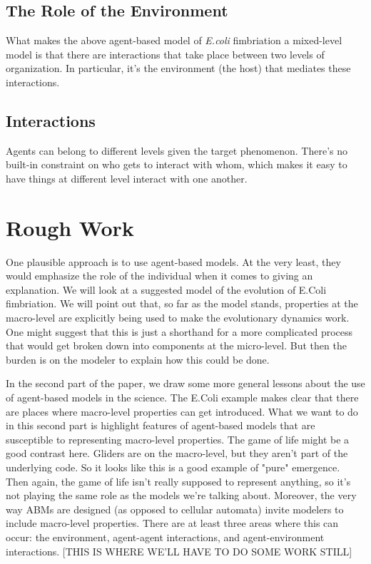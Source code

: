 \documentclass[11pt]{article}
\begin{document}
\subsection{The Role of the Environment}

What makes the above agent-based model of \emph{E.coli} fimbriation a mixed-level model is that there are interactions that take place between two levels of organization. In particular, it's the environment (the host) that mediates these interactions.

\subsection{Interactions}

Agents can belong to different levels given the target phenomenon.  There's no built-in constraint on who gets to interact with whom, which makes it easy to have things at different level interact with one another.





\section{Rough Work}

One plausible approach is to use agent-based models. At the very least, they would emphasize the role of the individual when it comes to giving an explanation. We will look at a suggested model of the evolution of E.Coli fimbriation. We will point out that, so far as the model stands, properties at the macro-level are explicitly being used to make the evolutionary dynamics work. One might suggest that this is just a shorthand for a more complicated process that would get broken down into components at the micro-level. But then the burden is on the modeler to explain how this could be done.

In the second part of the paper, we draw some more general lessons about the use of agent-based models in the science. The E.Coli example makes clear that there are places where macro-level properties can get introduced. What we want to do in this second part is highlight features of agent-based models that are susceptible to representing macro-level properties.  The game of life might be a good contrast here. Gliders are on the macro-level, but they aren't part of the underlying code. So it looks like this is a good example of "pure" emergence. Then again, the game of life isn't really supposed to represent anything, so it's not playing the same role as the models we're talking about. Moreover, the very way ABMs are designed (as opposed to cellular automata) invite modelers to include macro-level properties. There are at least three areas where this can occur: the environment, agent-agent interactions, and agent-environment interactions. [THIS IS WHERE WE'LL HAVE TO DO SOME WORK STILL]
\end{document}
